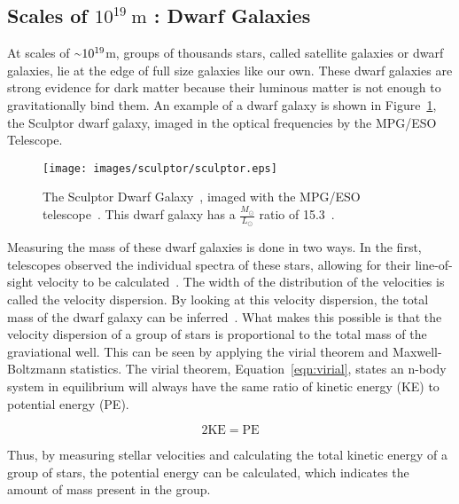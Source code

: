   \subsection{Scales of $10^{19}\:\text{m}$ : Dwarf Galaxies}\label{dm_dwarfscale}
    At scales of $\nicetilde 10^{19}$m, groups of thousands stars, called satellite galaxies or dwarf galaxies, lie at the edge of full size galaxies like our own.
    These dwarf galaxies are strong evidence for dark matter because their luminous matter is not enough to gravitationally bind them.
    An example of a dwarf galaxy is shown in Figure~\ref{fig:sculptor}, the Sculptor dwarf galaxy, imaged in the optical frequencies by the MPG/ESO Telescope.

    \begin{figure}[h]
      \centering
      \texttt{[image: images/sculptor/sculptor.eps]}
      \caption[Sculptor Dwarf Galaxy]{
        The Sculptor Dwarf Galaxy~\cite{sculptor_image}, imaged with the MPG/ESO telescope~\cite{sculptor_paper}.
        This dwarf galaxy has a $\frac{M_\odot}{L_\odot}$ ratio of 15.3~\cite{sculptor_ml}.
      }
      \label{fig:sculptor}
    \end{figure}

    Measuring the mass of these dwarf galaxies is done in two ways.
    In the first, telescopes observed the individual spectra of these stars, allowing for their line-of-sight velocity to be calculated~\cite{dwarf_gal_red_giant}.
    The width of the distribution of the velocities is called the velocity dispersion.
    By looking at this velocity dispersion, the total mass of the dwarf galaxy can be inferred~\cite{dwarf_gal_vel_dispersion, dwarf_gal_vel_dispersion2}.
    What makes this possible is that the velocity dispersion of a group of stars is proportional to the total mass of the graviational well.
    This can be seen by applying the virial theorem and Maxwell-Boltzmann statistics.
    The virial theorem, Equation~\ref{eqn:virial}, states an n-body system in equilibrium will always have the same ratio of kinetic energy (KE) to potential energy (PE).

    \begin{equation}\label{eqn:virial}
      2 \text{KE} = \text{PE}
    \end{equation}

    Thus, by measuring stellar velocities and calculating the total kinetic energy of a group of stars, the potential energy can be calculated, which indicates the amount of mass present in the group.

